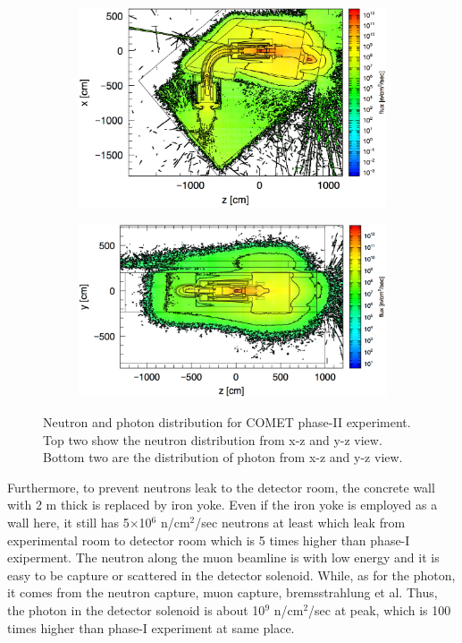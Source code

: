   \begin{figure}[H]
   \begin{subfigure}{0.26\textwidth}
   \centering
   \includegraphics[scale=0.36]{chapter3/fig/photonzx.pdf}
   \end{subfigure}
   \hspace{0.2\textwidth}
   \begin{subfigure}{0.26\textwidth}
   \centering
   \includegraphics[scale=0.34]{chapter3/fig/photonyz.pdf}
   \end{subfigure}
   \caption{Neutron and photon distribution for COMET phase-II experiment. Top two show the neutron distribution from x-z and y-z view. Bottom two are the distribution of photon from x-z and y-z view.}
   \label{2photon}
  \end{figure}
Furthermore, to prevent neutrons leak to the detector room, the concrete wall with 2 m thick is replaced by iron yoke.
Even if the iron yoke is employed as a wall here, it still has 5$\times$10$^6$ n/cm$^2$/sec neutrons at least which leak from experimental room to detector room which is 5 times higher than phase-I exiperment.
The neutron along the muon beamline is with low energy and it is easy to be capture or scattered in the detector solenoid.
While, as for the photon, it comes from the neutron capture, muon capture, bremsstrahlung et al.
Thus, the photon in the detector solenoid is about 10$^9$ n/cm$^2$/sec at peak, which is 100 times higher than phase-I experiment at same place.

